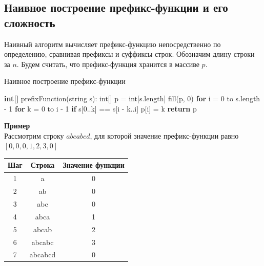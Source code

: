     \subsection{Наивное построение префикс-функции и его сложность}
        Наивный алгоритм вычисляет префикс-функцию непосредственно по определению, сравнивая префиксы и суффиксы строк. Обозначим длину строки за $n$. Будем считать, что префикс-функция хранится в массиве $p$.\\

        \begin{algorithm}
            \caption{Наивное построение префикс-функции}
            \begin{algorithmic}
                \STATE \textbf{int[]} prefixFunction(string s):
                \STATE \quad int[] p = int[s.length]
                \STATE \quad fill(p, 0)
                \STATE \quad \textbf{for} i = 0 to s.length - 1
                \STATE \quad\quad \textbf{for} k = 0 to i - 1
                \STATE \quad\quad\quad \textbf{if} s[0..k] == s[i - k..i]
                \STATE \quad\quad\quad\quad p[i] = k
                \STATE \quad \textbf{return} p
            \end{algorithmic}
        \end{algorithm}

        \textbf{Пример}\\
        Рассмотрим строку $abcabcd$, для которой значение префикс-функции равно $[0, 0, 0, 1, 2, 3, 0]$

        \begin{center}
            \begin{tabular}{c|c|c}
                \textbf{Шаг} & \textbf{Строка} & \textbf{Значение функции} \\
                \hline
                1 & a & 0 \\
                \hline
                2 & ab & 0 \\
                \hline
                3 & abc & 0 \\
                \hline
                4 & abca & 1 \\
                \hline
                5 & abcab & 2 \\
                \hline
                6 & abcabc & 3 \\
                \hline
                7 & abcabcd & 0 \\
                \hline
            \end{tabular}
        \end{center}
        
